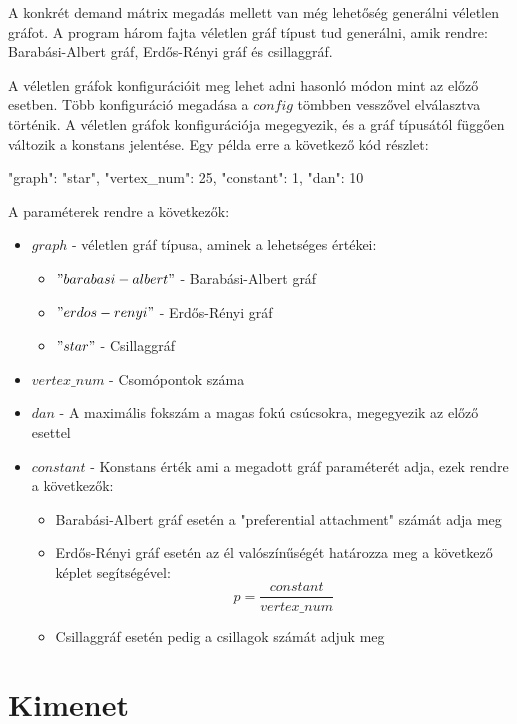 \documentclass[12pt]{report}
\begin{document}
A konkrét demand mátrix megadás mellett van még lehetőség generálni véletlen gráfot.
A program három fajta véletlen gráf típust tud generálni, amik rendre: Barabási-Albert gráf, Erdős-Rényi gráf és csillaggráf.

A véletlen gráfok konfigurációit meg lehet adni hasonló módon mint az előző esetben.
Több konfiguráció megadása a $config$ tömbben vesszővel elválasztva történik.
A véletlen gráfok konfigurációja megegyezik, és a gráf típusától függően változik a konstans jelentése. 
Egy példa erre a következő kód részlet:

\pagebreak

\begin{mintedJson}
{
	"graph": "star",
	"vertex_num": 25,
	"constant": 1,
	"dan": 10
}
\end{mintedJson}


A paraméterek rendre a következők:

\begin{itemize}
	\item $graph$ - véletlen gráf típusa, aminek a lehetséges értékei:
	\begin{itemize}
		\item $"barabasi-albert"$ - Barabási-Albert gráf
		\item $"erdos-renyi"$ - Erdős-Rényi gráf
		\item $"star"$ - Csillaggráf
	\end{itemize}
	
	\item $vertex\_num$ - Csomópontok száma
	\item $dan$ - A maximális fokszám a magas fokú csúcsokra, megegyezik az előző esettel
	\item $constant$ - Konstans érték ami a megadott gráf paraméterét adja, ezek rendre a következők:
	\begin{itemize}
		\item Barabási-Albert gráf esetén a "preferential attachment" számát adja meg
		\item Erdős-Rényi gráf esetén az él valószínűségét határozza meg a következő képlet segítségével:  \[p = \frac{constant}{vertex\_num}\]
		\item Csillaggráf esetén pedig a csillagok számát adjuk meg
	\end{itemize}
\end{itemize}


\section{Kimenet}
\end{document}
